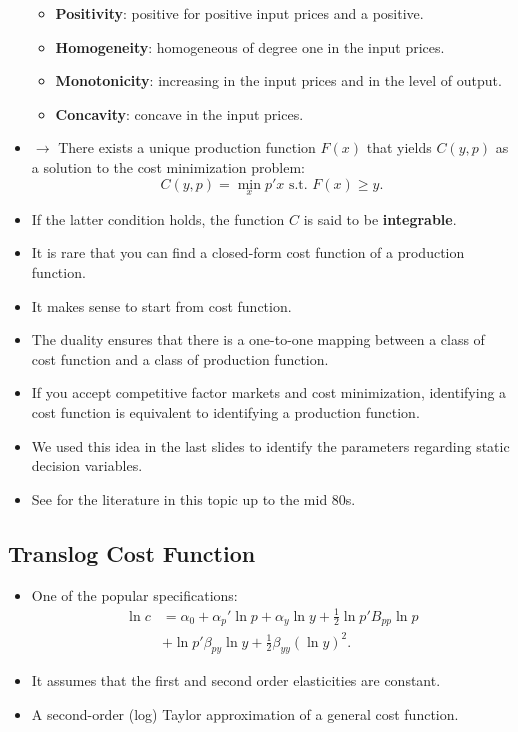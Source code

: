 \documentclass[
]{book}
\providecommand{\tightlist}{%
  \setlength{\itemsep}{0pt}\setlength{\parskip}{0pt}}
\begin{document}
\begin{itemize}
  \begin{itemize}
  \tightlist
  \item
    \textbf{Positivity}: positive for positive input prices and a positive.
  \item
    \textbf{Homogeneity}: homogeneous of degree one in the input prices.
  \item
    \textbf{Monotonicity}: increasing in the input prices and in the level of output.
  \item
    \textbf{Concavity}: concave in the input prices.
  \end{itemize}
\item
  \(\rightarrow\) There exists a unique production function \(F(x)\) that yields \(C(y, p)\) as a solution to the cost minimization problem:
  \begin{equation}
  C(y, p) = \min_{x} p'x \text{   s.t.   } F(x) \ge y.
  \end{equation}
\item
  If the latter condition holds, the function \(C\) is said to be \textbf{integrable}.
\item
  It is rare that you can find a closed-form cost function of a production function.
\item
  It makes sense to start from cost function.
\item
  The duality ensures that there is a one-to-one mapping between a class of cost function and a class of production function.
\item
  If you accept competitive factor markets and cost minimization, identifying a cost function is equivalent to identifying a production function.
\item
  We used this idea in the last slides to identify the parameters regarding static decision variables.
\item
  See \citet{Jorgenson1986} for the literature in this topic up to the mid 80s.
\end{itemize}

\hypertarget{translog-cost-function}{%
\subsection{Translog Cost Function}\label{translog-cost-function}}

\begin{itemize}
\tightlist
\item
  One of the popular specifications:
  \begin{equation}
  \begin{split}
  \ln c &= \alpha_0 + \alpha_p' \ln p + \alpha_y \ln y + \frac{1}{2} \ln p' B_{pp} \ln p\\
  & + \ln p' \beta_{py} \ln y + \frac{1}{2}\beta_{yy}(\ln y)^2.
  \end{split}
  \end{equation}
\item
  It assumes that the first and second order elasticities are constant.
\item
  A second-order (log) Taylor approximation of a general cost function.
\end{itemize}
\end{document}
